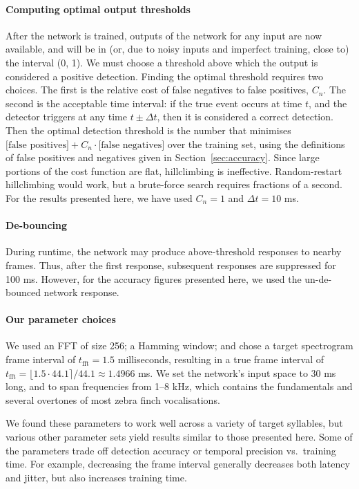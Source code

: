 \documentclass[10pt,letterpaper]{article}
\renewcommand{\subsubsection}[1]{\paragraph{#1}}
\begin{document}
\subsubsection{Computing optimal output thresholds}
\label{sec:optimalthresholds}
After the network is trained, outputs of the network for any input are
now available, and will be in (or, due to noisy inputs and imperfect
training, close to) the interval (0, 1). We must choose a threshold
above which the output is considered a positive detection. Finding the
optimal threshold requires two choices. The first is the relative cost
of false negatives to false positives, $C_n$. The second is the
acceptable time interval: if the true event occurs at time $t$, and
the detector triggers at any time $t\pm\Delta t$, then it is
considered a correct detection. Then the optimal detection threshold
is the number that minimises $\textrm{[false positives]}
+C_n\cdot\textrm{[false negatives]}$ over the training set, using the
definitions of false positives and negatives given in
Section~\ref{sec:accuracy}. Since large portions of the cost function
are flat, hillclimbing is ineffective.  Random-restart hillclimbing
would work, but a brute-force search requires fractions of a
second. For the results presented here, we have used $C_n=1$ and
$\Delta t=10$ ms.

\subsubsection{De-bouncing}

During runtime, the network may produce above-threshold responses to nearby
frames.  Thus, after the first response, subsequent responses are suppressed
for 100 ms.  However, for the accuracy figures presented here, we used
the un-de-bounced network response.

\subsubsection{Our parameter choices}

We used an FFT of size 256; a Hamming window; and chose a target
spectrogram frame interval of $t_\textrm{fft}=1.5$ milliseconds,
resulting in a true frame interval of $t_\textrm{fft}=\lfloor 1.5\cdot
44.1\rceil /44.1\approx 1.4966$ ms.  We set the network's input space
to 30 ms long, and to span frequencies from 1--8 kHz, which contains
the fundamentals and several overtones of most zebra finch
vocalisations.

We found these parameters to work well across a variety of target
syllables, but various other parameter sets yield results similar to
those presented here.  Some of the parameters trade off detection
accuracy or temporal precision vs.~training time. For example,
decreasing the frame interval generally decreases both latency and
jitter, but also increases training time.
\end{document}
